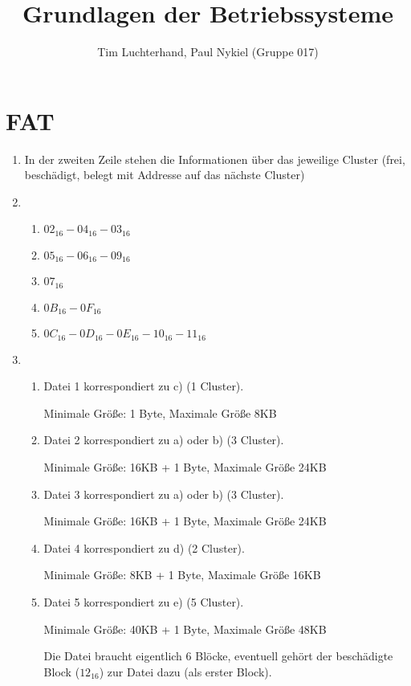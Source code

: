 \documentclass[DIN, pagenumber=false, fontsize=11pt, parskip=half]{scrartcl}
\title{Grundlagen der Betriebssysteme}
\author{Tim Luchterhand, Paul Nykiel (Gruppe 017)}
\begin{document}
    \maketitle
    \section{FAT}
    \begin{enumerate}[label=(\alph*)]
        \item In der zweiten Zeile stehen die Informationen über das jeweilige Cluster (frei, beschädigt, belegt mit Addresse auf das nächste Cluster)
        \item 
            \begin{enumerate}
                \item ${02}_{16}-{04}_{16}-{03}_{16}$
                \item ${05}_{16}-{06}_{16}-{09}_{16}$ 
                \item ${07}_{16}$
                \item ${0B}_{16}-{0F}_{16}$
                \item ${0C}_{16}-{0D}_{16}-{0E}_{16}-{10}_{16}-{11}_{16}$            
            \end{enumerate}
        \item 
            \begin{enumerate}
                \item Datei 1 korrespondiert zu c) (1 Cluster). 
                    
                    Minimale Größe: 1 Byte, Maximale Größe 8KB
                \item Datei 2 korrespondiert zu a) oder b) (3 Cluster). 
                    
                    Minimale Größe: 16KB + 1 Byte, Maximale Größe 24KB
                \item Datei 3 korrespondiert zu a) oder b) (3 Cluster). 
                    
                    Minimale Größe: 16KB + 1 Byte, Maximale Größe 24KB
                \item Datei 4 korrespondiert zu d) (2 Cluster). 
                    
                    Minimale Größe: 8KB + 1 Byte, Maximale Größe 16KB
                \item Datei 5 korrespondiert zu e) (5 Cluster). 
                    
                    Minimale Größe: 40KB + 1 Byte, Maximale Größe 48KB

                    Die Datei braucht eigentlich 6 Blöcke, eventuell gehört der beschädigte Block (${12}_{16}$) zur Datei dazu (als erster Block).
            \end{enumerate}
    \end{enumerate}
\end{document}
